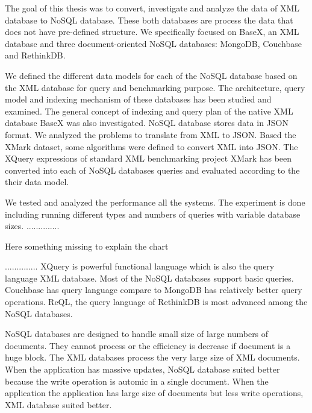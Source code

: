 The goal of this thesis was to convert, investigate and analyze the data of XML database to NoSQL database. These both databases are process the data that does not have pre-defined structure. We specifically focused on BaseX, an XML database and three document-oriented NoSQL databases: MongoDB, Couchbase and RethinkDB. 

We defined the different data models for each of the NoSQL database based on the XML database for query and benchmarking purpose. The architecture, query model and indexing mechanism of these databases has been studied and examined. The general concept of indexing and query plan of the native XML database BaseX was also investigated. NoSQL database stores data in JSON format. We analyzed the problems  to translate  from XML to JSON. Based the XMark dataset, some algorithms were defined to convert XML into JSON.
The XQuery expressions of standard XML benchmarking project XMark has been converted into each of NoSQL databases queries and evaluated according to the their data model. 

\par

We tested and analyzed the performance all the systems. The experiment is done including running different types and numbers of queries with variable database sizes. 
..............

Here something missing to explain the chart

..............
XQuery is powerful functional language which is also the query language XML database. Most of the NoSQL databases support basic queries. Couchbase has query language compare to MongoDB has relatively better query operations. ReQL, the query language of RethinkDB is most advanced among the NoSQL databases. 

\par
NoSQL databases are designed to handle small size of large numbers of documents. They cannot process or the efficiency is decrease if document is a huge block. The XML databases process the very large size of XML documents. When the application has massive updates, NoSQL database suited better because the write operation is automic in a single document. When the application the application has large size of documents but less write operations,  XML database suited better. 






